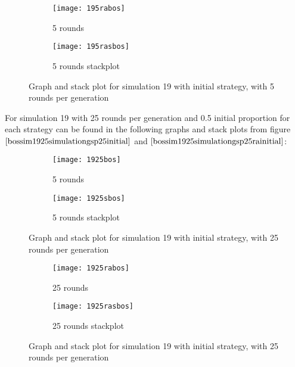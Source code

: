 \begin{figure}[H]       
    \centering
    \begin{subfigure}[b]{0.3\textwidth}
	\centering
	{\texttt{[image: 195rabos]}}   
    	\caption{5 rounds}
	\label{fig:bossim195ra}
    \end{subfigure}
    \hfill
    \begin{subfigure}[b]{0.3\textwidth}
	\centering
	{\texttt{[image: 195rasbos]}}   
    	\caption{5 rounds stackplot}
	\label{fig:bossim195ras}
    \end{subfigure}
    \caption{Graph and stack plot for simulation 19 with initial strategy, with 5 rounds per generation}
    \label{bossim195simulationgsp5rainitial}
\end{figure}

For simulation 19 with 25 rounds per generation and 0.5 initial proportion for each strategy can be found in the following graphs and stack plots from figure $\ref{bossim1925simulationgsp25initial}$ and $\ref{bossim1925simulationgsp25rainitial}$:

\begin{figure}[H]       
    \centering
    \begin{subfigure}[b]{0.3\textwidth}
	\centering
	{\texttt{[image: 1925bos]}}   
    	\caption{5 rounds}
	\label{fig:bossim1925r25}
    \end{subfigure}
    \hfill
    \begin{subfigure}[b]{0.3\textwidth}
	\centering
	{\texttt{[image: 1925sbos]}}   
    	\caption{5 rounds stackplot}
	\label{fig:bossim1925rs25}
    \end{subfigure}
    \caption{Graph and stack plot for simulation 19 with initial strategy, with 25 rounds per generation}
    \label{bossim1925simulationgsp25initial}
\end{figure}

\begin{figure}[H]       
    \centering
    \begin{subfigure}[b]{0.3\textwidth}
	\centering
	{\texttt{[image: 1925rabos]}}   
    	\caption{25 rounds}
	\label{fig:bossim1925ra}
    \end{subfigure}
    \hfill
    \begin{subfigure}[b]{0.3\textwidth}
	\centering
	{\texttt{[image: 1925rasbos]}}   
    	\caption{25 rounds stackplot}
	\label{fig:bossim1925ras}
    \end{subfigure}
    \caption{Graph and stack plot for simulation 19 with initial strategy, with 25 rounds per generation}
    \label{bossim1925simulationgsp25rainitial}
\end{figure}

